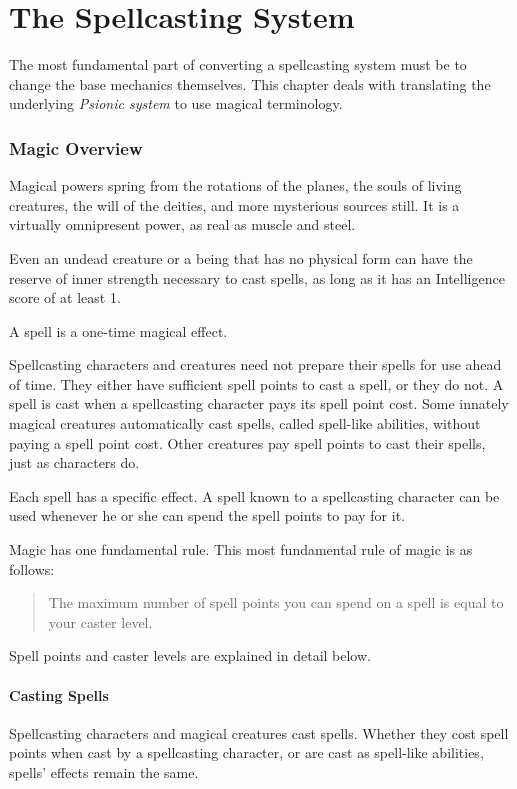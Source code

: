 \documentclass[../VancianToPsionics.tex]{subfiles}
\begin{document}
\part{The Spellcasting System} 
The most fundamental part of converting a spellcasting system must be to change the base mechanics themselves. This chapter deals with translating the underlying \emph{Psionic system} to use magical terminology.

\section{Magic Overview}
\label{sec:MagicOverview}
Magical powers spring from the rotations of the planes, the souls of living creatures, the will of the deities, and more mysterious sources still. It is a virtually omnipresent power, as real as muscle and steel.

Even an undead creature or a being that has no physical form can have the reserve of inner strength necessary to cast spells, as long as it has an Intelligence score of at least 1.

A spell is a one-time magical effect. 

Spellcasting characters and creatures need not prepare their spells for use ahead of time. They either have sufficient spell points to cast a spell, or they do not. A spell is cast when a spellcasting character pays its spell point cost. Some innately magical creatures automatically cast spells, called spell-like abilities, without paying a spell point cost. Other creatures pay spell points to cast their spells, just as characters do.

Each spell has a specific effect. A spell known to a spellcasting character can be used whenever he or she can spend the spell points to pay for it.

Magic has one fundamental rule. This most fundamental rule of magic is as follows:
\begin{quote}
\Large The maximum number of spell points you can spend on a spell is equal to your caster level.
\end{quote}
Spell points and caster levels are explained in detail below.

\subsection{Casting Spells}
Spellcasting characters and magical creatures cast spells. Whether they cost spell points when cast by a spellcasting character, or are cast as spell-like abilities, spells' effects remain the same.
\end{document}
